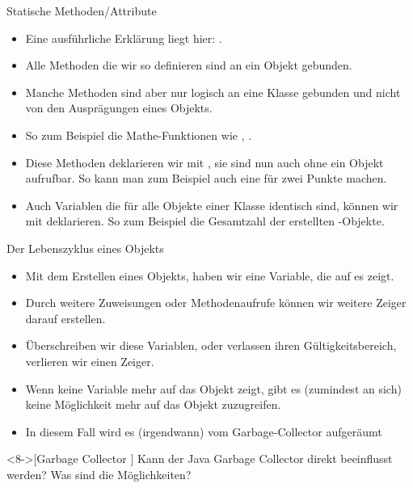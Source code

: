 \begin{frame}[fragile]{Statische Methoden/Attribute}
\begin{itemize}[<+(1)->]
    \item<1-> Eine ausführliche Erklärung liegt hier: .
    \item Alle Methoden die wir so definieren sind an ein Objekt gebunden.
    \item Manche Methoden sind aber nur logisch an eine Klasse gebunden\pause{} und nicht von den Ausprägungen eines Objekts.
    \item So zum Beispiel die Mathe-Funktionen wie , .
    \item Diese Methoden deklarieren wir mit ,\pause{} sie sind nun auch ohne ein Objekt aufrufbar.\pause{} So kann man zum Beispiel auch eine  für zwei Punkte machen.
    \item Auch Variablen die für alle Objekte einer Klasse identisch sind,\pause{} können wir mit  deklarieren.\pause{} So zum Beispiel die Gesamtzahl der erstellten -Objekte.
\end{itemize}
\end{frame}

\begin{frame}[fragile]{Der Lebenszyklus eines Objekts}
    \begin{itemize}[<+(1)->]
        \item Mit dem Erstellen eines Objekts,\pause{} haben wir eine Variable, die auf es zeigt.
        \item Durch weitere Zuweisungen\pause{} oder Methodenaufrufe können wir weitere Zeiger darauf erstellen.
        \item Überschreiben wir diese Variablen, oder verlassen ihren Gültigkeitsbereich,\pause{} verlieren wir einen Zeiger.
        \item Wenn keine Variable mehr auf das Objekt zeigt,\pause{} gibt es (zumindest an sich) keine Möglichkeit mehr auf das Objekt zuzugreifen.
        \item In diesem Fall wird es (irgendwann) vom Garbage-Collector aufgeräumt
    \end{itemize}
\ifull
    \begin{exercise}<8->[Garbage Collector ]
        \pause{}Kann der Java Garbage Collector direkt beeinflusst werden? Was sind die Möglichkeiten?
    \end{exercise}
\fi{}
\end{frame}

